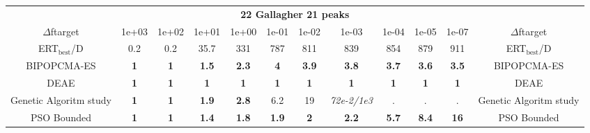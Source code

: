 \begin{tabular}{cccccccccccc}
 & \multicolumn{10}{c}{{\normalsize \textbf{22 Gallagher 21 peaks}}}\\
$\Delta$ftarget& 1e+03& 1e+02& 1e+01& 1e+00& 1e-01& 1e-02& 1e-03& 1e-04& 1e-05& 1e-07 & $\Delta$ftarget \\
ERT$_{\textrm{best}}$/D& 0.2& 0.2& 35.7& 331& 787& 811& 839& 854& 879& 911 & ERT$_{\textrm{best}}$/D \\
\hline
BIPOPCMA-ES & \textbf{1} & \textbf{1} & \textbf{1.5} & \textbf{2.3} & \textbf{4} & \textbf{3.9} & \textbf{3.8} & \textbf{3.7} & \textbf{3.6} & \textbf{3.5} & BIPOPCMA-ES \cite{add_an_entry_for_BIPOPCMA-ES_in_bbob.bib}\\
DEAE & \textbf{1} & \textbf{1} & \textbf{1} & \textbf{1} & \textbf{1} & \textbf{1} & \textbf{1} & \textbf{1} & \textbf{1} & \textbf{1} & DEAE \cite{add_an_entry_for_DEAE_in_bbob.bib}\\
Genetic Algoritm study & \textbf{1} & \textbf{1} & \textbf{1.9} & \textbf{2.8} & 6.2 & 19 & \textit{72e-2}\textit{/1e3} & . & . & . & Genetic Algoritm study \cite{add_an_entry_for_Genetic Algoritm study_in_bbob.bib}\\
PSO Bounded & \textbf{1} & \textbf{1} & \textbf{1.4} & \textbf{1.8} & \textbf{1.9} & \textbf{2} & \textbf{2.2} & \textbf{5.7} & \textbf{8.4} & \textbf{16} & PSO Bounded \cite{add_an_entry_for_PSO Bounded_in_bbob.bib}
\end{tabular}
